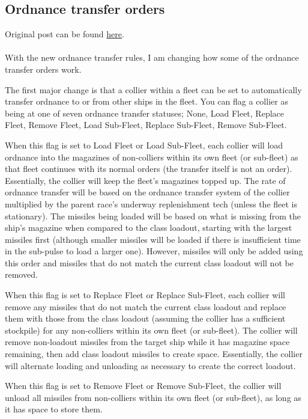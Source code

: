 \documentclass[../../Aurora C# unofficial manual.tex]{subfiles}
\begin{document}
	\subsection{Ordnance transfer orders}
	Original post can be found
	\href{http://aurora2.pentarch.org/index.php?topic=8495.msg104196#msg104196}{here}.
	\\\\
	
	With the new ordnance transfer rules, I am changing how some of the ordnance transfer orders work.
	
	The first major change is that a collier within a fleet can be set to automatically transfer ordnance to or from other ships in the fleet. You can flag a collier as being at one of seven ordnance transfer statuses; None, Load Fleet, Replace Fleet, Remove Fleet, Load Sub-Fleet, Replace Sub-Fleet, Remove Sub-Fleet.
	
	When this flag is set to Load Fleet or Load Sub-Fleet, each collier will load ordnance into the magazines of non-colliers within its own fleet (or sub-fleet) as that fleet continues with its normal orders (the transfer itself is not an order). Essentially, the collier will keep the fleet's magazines topped up. The rate of ordnance transfer will be based on the ordnance transfer system of the collier multiplied by the parent race's underway replenishment tech (unless the fleet is stationary). The missiles being loaded will be based on what is missing from the ship's magazine when compared to the class loadout, starting with the largest missiles first (although smaller missiles will be loaded if there is insufficient time in the sub-pulse to load a larger one). However, missiles will only be added using this order and missiles that do not match the current class loadout will not be removed.
	
	When this flag is set to Replace Fleet or Replace Sub-Fleet, each collier will remove any missiles that do not match the current class loadout and replace them with those from the class loadout (assuming the collier has a sufficient stockpile) for any non-colliers within its own fleet (or sub-fleet). The collier will remove non-loadout missiles from the target ship while it has magazine space remaining, then add class loadout missiles to create space. Essentially, the collier will alternate loading and unloading as necessary to create the correct loadout.
	
	When this flag is set to Remove Fleet or Remove Sub-Fleet, the collier will unload all missiles from non-colliers within its own fleet (or sub-fleet), as long as it has space to store them.
	
\end{document}
